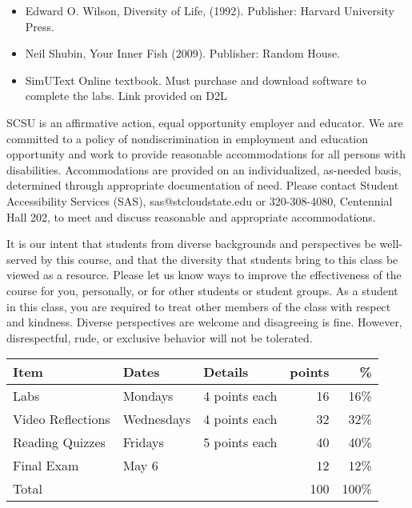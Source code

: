 \documentclass{tufte-handout}
\begin{document}
\begin{fullwidth}
\begin{itemize}
	\item Edward O. Wilson, Diversity of Life, (1992). Publisher: Harvard University Press.
	\item Neil Shubin, Your Inner Fish (2009). Publisher: Random House.
	\item SimUText Online textbook. Must purchase and download software to complete the labs. Link provided on D2L
\end{itemize}


\newpage


 SCSU is an affirmative action, equal opportunity employer and educator. We are committed to a policy of nondiscrimination in employment and education opportunity and work to provide reasonable accommodations for all persons with disabilities. Accommodations are provided on an individualized, as-needed basis, determined through appropriate documentation of need. Please contact Student Accessibility Services (SAS), sas@stcloudstate.edu or 320-308-4080, Centennial Hall 202, to meet and discuss reasonable and appropriate accommodations. 

 It is our intent that students from diverse backgrounds and perspectives be well-served by this course, and that the diversity that students bring to this class be viewed as a resource. Please let us know ways to improve the effectiveness of the course for you, personally, or for other students or student groups. As a student in this class, you are required to treat other members of the class with respect and kindness. Diverse perspectives are welcome and disagreeing is fine. However, disrespectful, rude, or exclusive behavior will not be tolerated.




\end{fullwidth}




\begin{table}
\begin{tabular}{l l l r r }
Item & Dates & Details & points &  \% \\
\hline
Labs & Mondays & 4 points each & 16 & 16\% \\
Video Reflections  & Wednesdays & 4 points each & 32 & 32\% \\
Reading Quizzes & Fridays & 5 points each & 40 & 40\% \\
Final Exam & May 6 & & 12  & 12\% \\
\hline
Total & & & 100 & 100\% \\
\end{tabular}
\end{table}
\end{document}
